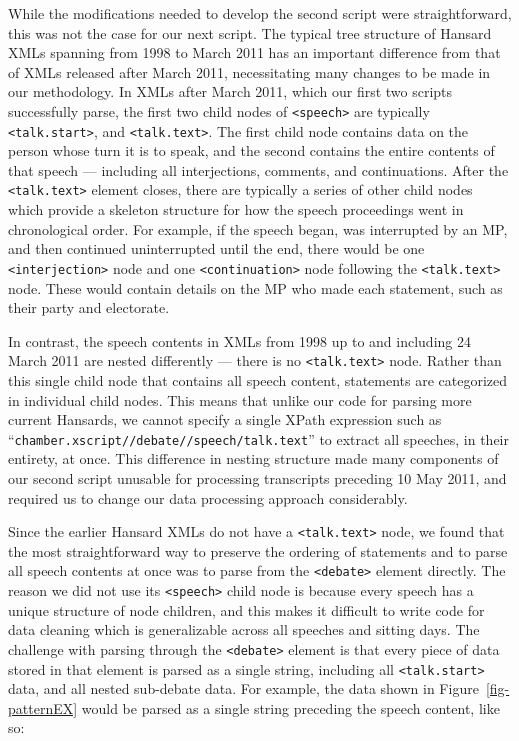 \documentclass[
  letterpaper,
  DIV=11,
  numbers=noendperiod]{scrartcl}
\begin{document}
While the modifications needed to develop the second script were
straightforward, this was not the case for our next script. The typical
tree structure of Hansard XMLs spanning from 1998 to March 2011 has an
important difference from that of XMLs released after March 2011,
necessitating many changes to be made in our methodology. In XMLs after
March 2011, which our first two scripts successfully parse, the first
two child nodes of \texttt{\textless{}speech\textgreater{}} are
typically \texttt{\textless{}talk.start\textgreater{}}, and
\texttt{\textless{}talk.text\textgreater{}}. The first child node
contains data on the person whose turn it is to speak, and the second
contains the entire contents of that speech --- including all
interjections, comments, and continuations. After the
\texttt{\textless{}talk.text\textgreater{}} element closes, there are
typically a series of other child nodes which provide a skeleton
structure for how the speech proceedings went in chronological order.
For example, if the speech began, was interrupted by an MP, and then
continued uninterrupted until the end, there would be one
\texttt{\textless{}interjection\textgreater{}} node and one
\texttt{\textless{}continuation\textgreater{}} node following the
\texttt{\textless{}talk.text\textgreater{}} node. These would contain
details on the MP who made each statement, such as their party and
electorate.

In contrast, the speech contents in XMLs from 1998 up to and including
24 March 2011 are nested differently --- there is no
\texttt{\textless{}talk.text\textgreater{}} node. Rather than this
single child node that contains all speech content, statements are
categorized in individual child nodes. This means that unlike our code
for parsing more current Hansards, we cannot specify a single XPath
expression such as
``\texttt{chamber.xscript//debate//speech/talk.text}'' to extract all
speeches, in their entirety, at once. This difference in nesting
structure made many components of our second script unusable for
processing transcripts preceding 10 May 2011, and required us to change
our data processing approach considerably.

Since the earlier Hansard XMLs do not have a
\texttt{\textless{}talk.text\textgreater{}} node, we found that the most
straightforward way to preserve the ordering of statements and to parse
all speech contents at once was to parse from the
\texttt{\textless{}debate\textgreater{}} element directly. The reason we
did not use its \texttt{\textless{}speech\textgreater{}} child node is
because every speech has a unique structure of node children, and this
makes it difficult to write code for data cleaning which is
generalizable across all speeches and sitting days. The challenge with
parsing through the \texttt{\textless{}debate\textgreater{}} element is
that every piece of data stored in that element is parsed as a single
string, including all \texttt{\textless{}talk.start\textgreater{}} data,
and all nested sub-debate data. For example, the data shown in
Figure~\ref{fig-patternEX} would be parsed as a single string preceding
the speech content, like so:
\end{document}
